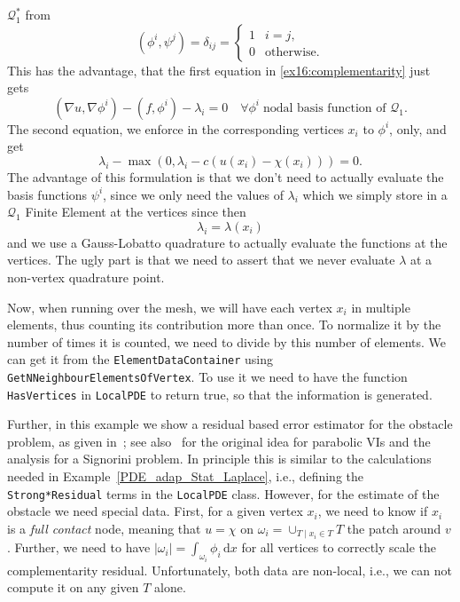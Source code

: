 $\mathcal Q_1^*$ from
\[
 (\phi^i,\psi^j) = \delta_{ij} = \begin{cases} 1 & i = j,\\ 0 &
   \text{otherwise.}
 \end{cases}
\] 
This has the advantage, that
the first equation in \eqref{ex16:complementarity} just gets
\[
  (\nabla u, \nabla \phi^i) - (f,\phi^i) - \lambda_i = 0 \quad \forall
    \phi^i \;\text{nodal basis function of $\mathcal Q_1$.}
\]
The second equation, we enforce in the corresponding vertices $x_i$ to
$\phi^i$, only, and get
\[
    \lambda_i - \max(0,\lambda_i-c(u(x_i)-\chi(x_i))) = 0.
\]
 The advantage of this formulation is that we don't need to actually
 evaluate the basis functions $\psi^i$, since we only need the values
 of $\lambda_i$ which we simply store in a $\mathcal Q_1$
 Finite Element at the vertices since then
 \[
   \lambda_i = \lambda(x_i) 
 \]
 and we use a Gauss-Lobatto quadrature to actually evaluate the
 functions at the vertices. The ugly part is that we need to assert
 that we never evaluate $\lambda$ at a non-vertex quadrature point.

 Now, when running over the mesh, we will have each vertex $x_i$ in
 multiple elements, thus counting its contribution more than once.
 To normalize it by the number of times it is counted, we need to
 divide by this number of elements. We can get it from the
 \texttt{ElementDataContainer} using
 \texttt{GetNNeighbourElementsOfVertex}.
 To use it we need to have the function \texttt{HasVertices} in
 \texttt{LocalPDE} to return true, so that the information is generated.

 Further, in this example we show a residual based error estimator
 for the obstacle problem, as given in~\cite{Walloth:2017}; see
 also~\cite{MoonNochettoPetersdorffZhang:2007,KrauseVeeserWalloth:2015} for the original idea for parabolic VIs and the analysis
 for a Signorini problem. In
 principle this is similar to the calculations needed in
 Example~\ref{PDE_adap_Stat_Laplace}, i.e., defining the
 \texttt{Strong*Residual} terms in the \texttt{LocalPDE} class.
 However, for the estimate of the obstacle we need special data.
 First, for a given vertex $x_i$, we need to know if
 $x_i$ is a \textit{full contact} node, meaning that $u = \chi$ on
 $\omega_i = \cup_{T \mid x_i \in T} T$ the patch around $v$. Further,
 we need to have $|\omega_i| = \int_{\omega_i} \phi_i\,\mathrm{d}x$ for all
 vertices to correctly scale the complementarity residual.
 Unfortunately, both data are non-local, i.e., we can not compute it
 on any given $T$ alone.

